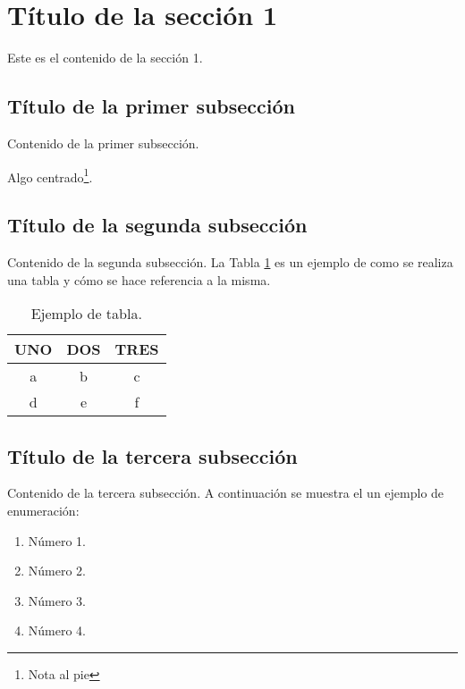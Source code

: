 \section{T\'itulo de la secci\'on 1}

    Este es el contenido de la secci\'on 1.

    \subsection{T\'itulo de la primer subsecci\'on}

	   Contenido de la primer subsecci\'on.

	   \begin{center}
		  Algo centrado\footnote{Nota al pie}.
	   \end{center}

    \subsection{T\'itulo de la segunda subsecci\'on}

	   Contenido de la segunda subsecci\'on. La Tabla \ref{tabla} es un ejemplo de como se realiza una tabla y c\'omo se hace referencia a la misma.

	   \begin{table}[h] %
		  \begin{center}
			 \begin{tabular}{ccc}\hline %
				\textbf{UNO} & \textbf{DOS} & \textbf{TRES}\\\hline
				a & b & c\\
				d & e & f\\\hline
			 \end{tabular}
		  \end{center}
	   \caption{Ejemplo de tabla. \label{tabla}} %
	   \end{table}

    \subsection{T\'itulo de la tercera subsecci\'on}

	   Contenido de la tercera subsecci\'on. A continuaci\'on se muestra el un ejemplo de enumeraci\'on:

	   \begin{enumerate}
		  \item N\'umero 1.
		  \item N\'umero 2.
		  \item N\'umero 3.
		  \item N\'umero 4.
	   \end{enumerate}

